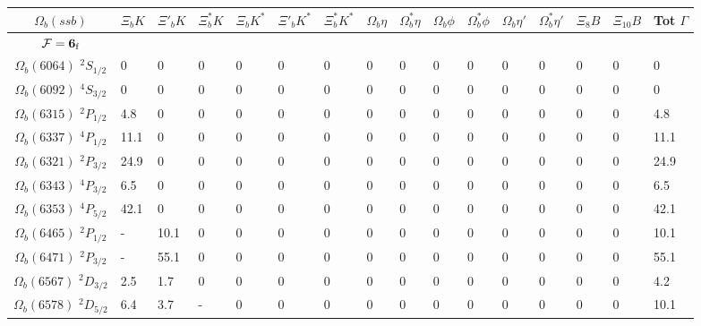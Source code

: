 \begin{tabular}{c |  p{0.58cm}  p{0.58cm}  p{0.58cm}  p{0.58cm}  p{0.58cm}  p{0.58cm}  p{0.58cm}  p{0.58cm}  p{0.58cm}  p{0.58cm}  p{0.58cm}  p{0.58cm}  p{0.58cm}  p{0.58cm}p{0.75cm}} \hline \hline
$\Omega_b(ssb)$  & $\Xi_{b} K$  & $\Xi'_{b} K$  & $\Xi^{*}_{b} K$  & $\Xi_{b} K^{*}$  & $\Xi'_{b}K^{*}$  & $\Xi^{*}_{b} K^{*}$  & $\Omega_{b} \eta$  & $\Omega^{*}_{b} \eta$  & $\Omega_{b} \phi$  & $\Omega^{*}_{b} \phi$  & $\Omega_{b} \eta'$  & $\Omega^{*}_{b} \eta'$  & $\Xi_{8} B$  & $\Xi_{10} B$  & Tot $\Gamma$  \\ \hline
$\mathcal{F}={\bf {6}}_{\rm f}$ &&&&&&&&&&&&&&\\ \hline
$\Omega_b(6064)$ $^{2}S_{1/2}$&$0$   &$0$   &$0$   &$0$   &$0$   &$0$   &$0$   &$0$   &$0$   &$0$   &$0$   &$0$   &$0$   &$0$   &$0$  \\
$\Omega_b(6092)$ $^{4}S_{3/2}$&$0$   &$0$   &$0$   &$0$   &$0$   &$0$   &$0$   &$0$   &$0$   &$0$   &$0$   &$0$   &$0$   &$0$   &$0$  \\
$\Omega_b(6315)$ $^{2}P_{1/2}$&4.8   &$0$   &$0$   &$0$   &$0$   &$0$   &$0$   &$0$   &$0$   &$0$   &$0$   &$0$   &$0$   &$0$   &4.8  \\
$\Omega_b(6337)$ $^{4}P_{1/2}$&11.1   &$0$   &$0$   &$0$   &$0$   &$0$   &$0$   &$0$   &$0$   &$0$   &$0$   &$0$   &$0$   &$0$   &11.1  \\
$\Omega_b(6321)$ $^{2}P_{3/2}$&24.9   &$0$   &$0$   &$0$   &$0$   &$0$   &$0$   &$0$   &$0$   &$0$   &$0$   &$0$   &$0$   &$0$   &24.9  \\
$\Omega_b(6343)$ $^{4}P_{3/2}$&6.5   &$0$   &$0$   &$0$   &$0$   &$0$   &$0$   &$0$   &$0$   &$0$   &$0$   &$0$   &$0$   &$0$   &6.5  \\
$\Omega_b(6353)$ $^{4}P_{5/2}$&42.1   &$0$   &$0$   &$0$   &$0$   &$0$   &$0$   &$0$   &$0$   &$0$   &$0$   &$0$   &$0$   &$0$   &42.1  \\
$\Omega_b(6465)$ $^{2}P_{1/2}$&-   &10.1   &$0$   &$0$   &$0$   &$0$   &$0$   &$0$   &$0$   &$0$   &$0$   &$0$   &$0$   &$0$   &10.1  \\
$\Omega_b(6471)$ $^{2}P_{3/2}$&-   &55.1   &$0$   &$0$   &$0$   &$0$   &$0$   &$0$   &$0$   &$0$   &$0$   &$0$   &$0$   &$0$   &55.1  \\
$\Omega_b(6567)$ $^{2}D_{3/2}$&2.5   &1.7   &$0$   &$0$   &$0$   &$0$   &$0$   &$0$   &$0$   &$0$   &$0$   &$0$   &$0$   &$0$   &4.2  \\
$\Omega_b(6578)$ $^{2}D_{5/2}$&6.4   &3.7   &-   &$0$   &$0$   &$0$   &$0$   &$0$   &$0$   &$0$   &$0$   &$0$   &$0$   &$0$   &10.1  \\

\end{tabular}
